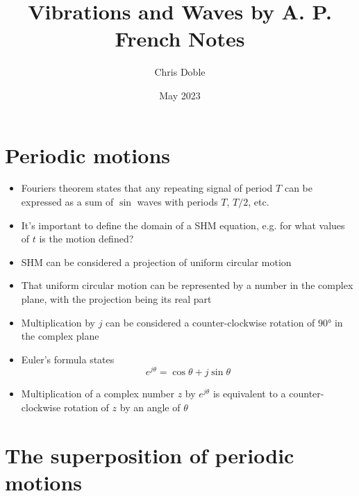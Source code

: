 \documentclass{article}
\title{Vibrations and Waves by A. P. French Notes}
\author{Chris Doble}
\date{May 2023}
\begin{document}
\maketitle

\tableofcontents

\section{Periodic motions}

\begin{itemize}
  \item Fouriers theorem states that any repeating signal of period $T$ can be expressed as a sum of $\sin$ waves with periods $T$, $T / 2$, etc.

  \item It's important to define the domain of a SHM equation, e.g. for what values of $t$ is the motion defined?

  \item SHM can be considered a projection of uniform circular motion

  \item That uniform circular motion can be represented by a number in the complex plane, with the projection being its real part

  \item Multiplication by $j$ can be considered a counter-clockwise rotation of $\ang{90}$ in the complex plane

  \item Euler's formula states \[e^{j \theta} = \cos \theta + j \sin \theta\]

  \item Multiplication of a complex number $z$ by $e^{j \theta}$ is equivalent to a counter-clockwise rotation of $z$ by an angle of $\theta$
\end{itemize}

\section{The superposition of periodic motions}
\end{document}
